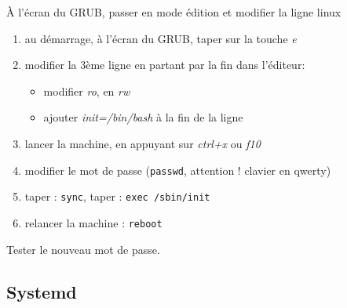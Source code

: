 \documentclass[a4paper]{article}
\begin{document}
À l’écran du GRUB, passer en mode édition et modifier la ligne linux
\begin{example}
    \begin{enumerate}
        \item au démarrage, à l'écran du GRUB, taper sur la touche \textit{e}
        \item modifier la 3ème ligne en partant par la fin dans l'éditeur:
        \begin{itemize}
            \item modifier \textit{ro}, en \textit{rw}
            \item ajouter \textit{init=/bin/bash} à la fin de la ligne
        \end{itemize}
        \item lancer la machine, en appuyant sur \textit{ctrl+x} ou \textit{f10}
        \item modifier le mot de passe (\texttt{passwd}, attention ! clavier en qwerty)
        \item taper : \texttt{sync}, taper : \texttt{exec /sbin/init}
        \item relancer la machine : \texttt{reboot}
    \end{enumerate}
\end{example}
Tester le nouveau mot de passe.










\subsection{Systemd}
\end{document}
